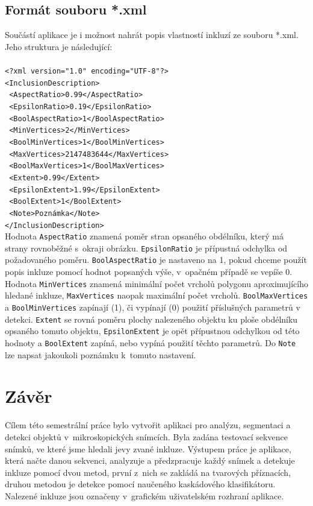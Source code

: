 \documentclass[12pt, a4paper]{report}
\begin{document}
	\section{Formát souboru *.xml}
	Součástí aplikace je i možnost nahrát popis vlastností inkluzí ze souboru *.xml. Jeho struktura je následující:\\
	\\
\texttt{<?xml version="1.0" encoding="UTF-8"?>}\\
\texttt{<InclusionDescription>}\\
	\texttt{	<AspectRatio>0.99</AspectRatio>}\\
    \texttt{	<EpsilonRatio>0.19</EpsilonRatio>}\\
    \texttt{	<BoolAspectRatio>1</BoolAspectRatio>}\\
    \texttt{	<MinVertices>2</MinVertices>}\\
    \texttt{	<BoolMinVertices>1</BoolMinVertices>}\\
    \texttt{	<MaxVertices>2147483644</MaxVertices>}\\
    \texttt{	<BoolMaxVertices>1</BoolMaxVertices>}\\
    \texttt{	<Extent>0.99</Extent>}\\
    \texttt{	<EpsilonExtent>1.99</EpsilonExtent>}\\
    \texttt{	<BoolExtent>1</BoolExtent>}\\
    \texttt{	<Note>Poznámka</Note>}\\
\texttt{</InclusionDescription>}\\

	Hodnota \texttt{AspectRatio} znamená poměr stran opsaného obdélníku, který má strany rovnoběžné s~okraji obrázku. \texttt{EpsilonRatio} je přípustná odchylka od požadovaného poměru. \texttt{BoolAspectRatio} je nastaveno na 1, pokud chceme použít popis inkluze pomocí hodnot popsaných výše, v~opačném případě se vepíše 0. Hodnota \texttt{MinVertices} znamená minimální počet vrcholů polygonu aproximujícího hledané inkluze, \texttt{MaxVertices} naopak maximální počet vrcholů. \texttt{BoolMaxVertices} a \texttt{BoolMinVertices} zapínají (1), či vypínají (0) použití příslušných parametrů v detekci. \texttt{Extent} se rovná poměru plochy nalezeného objektu ku ploše obdélníku opsaného tomuto objektu, \texttt{EpsilonExtent} je opět přípustnou odchylkou od této hodnoty a \texttt{BoolExtent} zapíná, nebo vypíná použití těchto parametrů. Do \texttt{Note} lze napsat jakoukoli poznámku k~tomuto nastavení.

\chapter{Závěr}
Cílem této semestrální práce bylo vytvořit aplikaci pro analýzu, segmentaci a detekci objektů v~mikroskopických snímcích. Byla zadána testovací sekvence snímků, ve které jsme hledali jevy zvané inkluze. Výstupem práce je aplikace, která načte danou sekvenci, analyzuje a předzpracuje každý snímek a detekuje inkluze pomocí dvou metod, první z~nich se zakládá na tvarových příznacích, druhou metodou je detekce pomocí naučeného kaskádového klasifikátoru. Nalezené inkluze jsou označeny v~grafickém uživatelském rozhraní aplikace.
\end{document}
